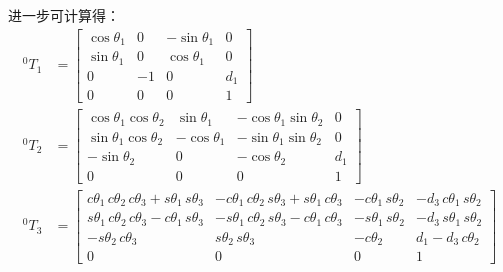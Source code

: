 \documentclass[UTF8, 12pt]{ctexart}
\begin{document}
进一步可计算得：
\[
\begin{aligned}
    {}^0 T_1 &= \begin{bmatrix}
                    \cos\theta_1 & 0 & -\sin\theta_1 & 0 \\
                    \sin\theta_1 & 0 & \cos\theta_1 & 0 \\
                    0 & -1 & 0 & d_1 \\
                    0 & 0 & 0 & 1
                \end{bmatrix} \\
    {}^0 T_2 &= \begin{bmatrix}
                    \cos\theta_1\cos\theta_2 & \sin\theta_1 & -\cos\theta_1\sin\theta_2 & 0 \\
                    \sin\theta_1\cos\theta_2 & -\cos\theta_1 & -\sin\theta_1\sin\theta_2 & 0 \\
                    -\sin\theta_2 & 0 & -\cos\theta_2 & d_1 \\
                    0 & 0 & 0 & 1
                \end{bmatrix} \\
    {}^0 T_3 &= \begin{bmatrix}
                    c\theta_1\, c\theta_2\, c\theta_3 + s\theta_1\, s\theta_3 & -c\theta_1\, c\theta_2\, s\theta_3 + s\theta_1\, c\theta_3 & -c\theta_1\, s\theta_2 & -d_3\, c\theta_1\, s\theta_2 \\
                    s\theta_1\, c\theta_2\, c\theta_3 - c\theta_1\, s\theta_3 & -s\theta_1\, c\theta_2\, s\theta_3 - c\theta_1\, c\theta_3 & -s\theta_1\, s\theta_2 & -d_3\, s\theta_1\, s\theta_2 \\
                    -s\theta_2\, c\theta_3 & s\theta_2\, s\theta_3 & -c\theta_2 & d_1 - d_3\, c\theta_2 \\
                    0 & 0 & 0 & 1
                \end{bmatrix}
\end{aligned}
\]
\end{document}
